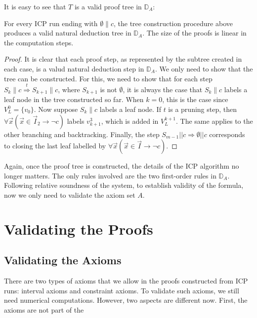 \documentclass[12pt]{article}
\begin{document}
It is easy to see that $T$ is a valid proof tree in $\mathbb{D}_A$:

\begin{proposition}\label{successful_tree}
For every ICP run ending with $\emptyset\parallel c$, the tree construction procedure above produces a valid natural deduction tree in $\mathbb{D}_A$. The size of the proofs is linear in the computation steps.
\end{proposition}

\begin{proof}
It is clear that each proof step, as represented by the subtree created in each case, is a valud natural deduction step in $\mathbb{D}_A$. We only need to show that the tree can be constructed. For this, we need to show that for each step $S_k\parallel c\stackrel{t}{\Longrightarrow} S_{k+1}\parallel c$, where $S_{k+1}$ is not $\emptyset$, it is always the case that $S_k\parallel c$ labels a leaf node in the tree constructed so far. When $k=0$, this is the case since $V_L^0 = \{v_0\}$. Now suppose $S_k\parallel c$ labels a leaf node. If $t$ is a pruning step, then $\forall \vec x(\vec x\in \vec I_2\rightarrow \neg c)$ labels $v^3_{k+1}$, which is added in $V_L^{k+1}$. The same applies to the other branching and backtracking. Finally, the step $S_{m-1}||c\Longrightarrow \emptyset||c$ corresponds to closing the last leaf labelled by $\forall \vec x(\vec x \in \vec I\rightarrow \neg c)$.
\end{proof}
Again, once the proof tree is constructed, the details of
the ICP algorithm no longer matters.  The only rules involved are the two
first-order rules in $\mathbb{D}_{A}$. Following relative soundness of the
system, to establish validity of the formula, now we only need to validate the
axiom set $A$.

\section{Validating the Proofs}\label{validate}

\subsection{Validating the Axioms}

There are two types of axioms that we allow in the proofs constructed from ICP runs: interval axioms and constraint axioms. To validate such axioms, we still need numerical computations. However, two aspects are different now. First, the axioms are not part of the 
\end{document}
